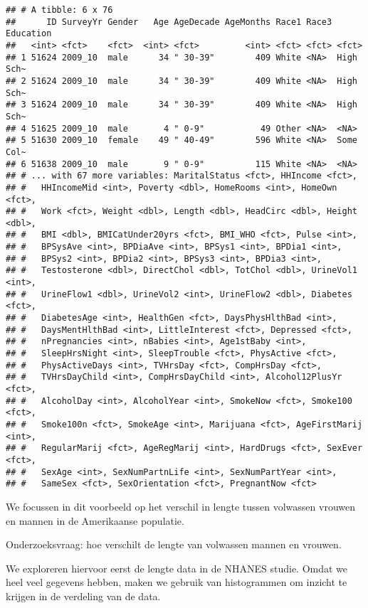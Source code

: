 \documentclass[
  12pt,dutch,coursenotes]{book}
\theoremstyle{definition}
\theoremstyle{definition}
\theoremstyle{definition}
\theoremstyle{remark}
\begin{document}
\begin{verbatim}
## # A tibble: 6 x 76
##      ID SurveyYr Gender   Age AgeDecade AgeMonths Race1 Race3 Education
##   <int> <fct>    <fct>  <int> <fct>         <int> <fct> <fct> <fct>    
## 1 51624 2009_10  male      34 " 30-39"        409 White <NA>  High Sch~
## 2 51624 2009_10  male      34 " 30-39"        409 White <NA>  High Sch~
## 3 51624 2009_10  male      34 " 30-39"        409 White <NA>  High Sch~
## 4 51625 2009_10  male       4 " 0-9"           49 Other <NA>  <NA>     
## 5 51630 2009_10  female    49 " 40-49"        596 White <NA>  Some Col~
## 6 51638 2009_10  male       9 " 0-9"          115 White <NA>  <NA>     
## # ... with 67 more variables: MaritalStatus <fct>, HHIncome <fct>,
## #   HHIncomeMid <int>, Poverty <dbl>, HomeRooms <int>, HomeOwn <fct>,
## #   Work <fct>, Weight <dbl>, Length <dbl>, HeadCirc <dbl>, Height <dbl>,
## #   BMI <dbl>, BMICatUnder20yrs <fct>, BMI_WHO <fct>, Pulse <int>,
## #   BPSysAve <int>, BPDiaAve <int>, BPSys1 <int>, BPDia1 <int>,
## #   BPSys2 <int>, BPDia2 <int>, BPSys3 <int>, BPDia3 <int>,
## #   Testosterone <dbl>, DirectChol <dbl>, TotChol <dbl>, UrineVol1 <int>,
## #   UrineFlow1 <dbl>, UrineVol2 <int>, UrineFlow2 <dbl>, Diabetes <fct>,
## #   DiabetesAge <int>, HealthGen <fct>, DaysPhysHlthBad <int>,
## #   DaysMentHlthBad <int>, LittleInterest <fct>, Depressed <fct>,
## #   nPregnancies <int>, nBabies <int>, Age1stBaby <int>,
## #   SleepHrsNight <int>, SleepTrouble <fct>, PhysActive <fct>,
## #   PhysActiveDays <int>, TVHrsDay <fct>, CompHrsDay <fct>,
## #   TVHrsDayChild <int>, CompHrsDayChild <int>, Alcohol12PlusYr <fct>,
## #   AlcoholDay <int>, AlcoholYear <int>, SmokeNow <fct>, Smoke100 <fct>,
## #   Smoke100n <fct>, SmokeAge <int>, Marijuana <fct>, AgeFirstMarij <int>,
## #   RegularMarij <fct>, AgeRegMarij <int>, HardDrugs <fct>, SexEver <fct>,
## #   SexAge <int>, SexNumPartnLife <int>, SexNumPartYear <int>,
## #   SameSex <fct>, SexOrientation <fct>, PregnantNow <fct>
\end{verbatim}

We focussen in dit voorbeeld op het verschil in lengte tussen volwassen vrouwen en mannen in de Amerikaanse populatie.

Onderzoeksvraag: hoe verschilt de lengte van volwassen mannen en vrouwen.

We exploreren hiervoor eerst de lengte data in de NHANES studie. Omdat we heel veel gegevens hebben, maken we gebruik van histogrammen om inzicht te krijgen in de verdeling van de data.
\end{document}
